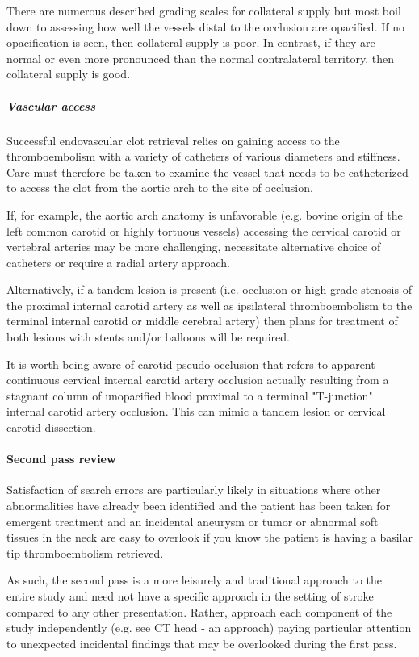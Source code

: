 There are numerous described grading scales for collateral supply but most boil down to assessing how well the vessels distal to the occlusion are opacified. If no opacification is seen, then collateral supply is poor. In contrast, if they are normal or even more pronounced than the normal contralateral territory, then collateral supply is good.

\subparagraph{Vascular access}

Successful endovascular clot retrieval relies on gaining access to the thromboembolism with a variety of catheters of various diameters and stiffness. Care must therefore be taken to examine the vessel that needs to be catheterized to access the clot from the aortic arch to the site of occlusion.

If, for example, the aortic arch anatomy is unfavorable (e.g. bovine origin of the left common carotid or highly tortuous vessels) accessing the cervical carotid or vertebral arteries may be more challenging, necessitate alternative choice of catheters or require a radial artery approach.

Alternatively, if a tandem lesion is present (i.e. occlusion or high-grade stenosis of the proximal internal carotid artery as well as ipsilateral thromboembolism to the terminal internal carotid or middle cerebral artery) then plans for treatment of both lesions with stents and/or balloons will be required.

It is worth being aware of carotid pseudo-occlusion that refers to apparent continuous cervical internal carotid artery occlusion actually resulting from a stagnant column of unopacified blood proximal to a terminal "T-junction" internal carotid artery occlusion. This can mimic a tandem lesion or cervical carotid dissection.

\paragraph{Second pass review}

Satisfaction of search errors are particularly likely in situations where other abnormalities have already been identified and the patient has been taken for emergent treatment and an incidental aneurysm or tumor or abnormal soft tissues in the neck are easy to overlook if you know the patient is having a basilar tip thromboembolism retrieved.

As such, the second pass is a more leisurely and traditional approach to the entire study and need not have a specific approach in the setting of stroke compared to any other presentation. Rather, approach each component of the study independently (e.g. see CT head - an approach) paying particular attention to unexpected incidental findings that may be overlooked during the first pass.

